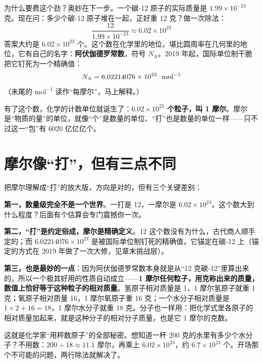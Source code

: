 为什么要费这个劲？奥妙在下一步。一个碳-12 原子的实际质量是 $1.99\times 10^{-23}$ 克。现在问：多少个碳-12 原子堆在一起，正好重 12 克？做一次除法：
\[
\frac{12}{1.99\times 10^{-23}}\approx 6.02\times 10^{23}
\]
答案大约是 $6.02\times 10^{23}$ 个。这个数在化学里的地位，堪比圆周率在几何里的地位，它有自己的名字：\textbf{阿伏伽德罗常数}，符号 $N_{\mathrm{A}}$。2019 年起，国际单位制干脆把它钉死为一个精确值：
\[
N_{\mathrm{A}}=6.02214076\times 10^{23}\ \ud{}{mol^{-1}}
\]
（末尾的 $\mathrm{mol^{-1}}$ 读作“每摩尔”，马上解释。）

有了这个数，化学的计数单位就诞生了：\textbf{$6.02\times 10^{23}$ 个粒子，叫 1 摩尔}。摩尔是“物质的量”的单位，就像“个”是数量的单位、“打”也是数量的单位一样——只不过这一“包”有 6020 亿亿亿个。

\section{摩尔像“打”，但有三点不同}

把摩尔理解成“打”的放大版，方向是对的，但有三个关键差别：

\textbf{第一，数量级完全不是一个世界}。一打是 12，一摩尔是 $6.02\times 10^{23}$。这个数大到什么程度？后面有个估算会专门震撼你一次。

\textbf{第二，“打”是约定俗成，摩尔是精确定义}。12 这个数没有为什么，古代商人顺手定的；而 $6.02214076\times 10^{23}$ 是被国际单位制钉死的精确值，它锚定在碳-12 上（锚定的方式在 2019 年做了一次大修，见章末挑战层）。

\textbf{第三，也是最妙的一点}：因为阿伏伽德罗常数本身就是从“12 克碳-12”里算出来的，所以一个极其好用的性质自动成立——\textbf{1 摩尔任何粒子，用克称出来的质量，数值上恰好等于这种粒子的相对质量}。氢原子相对质量是 1，1 摩尔氢原子就重 1 克；氧原子相对质量 16，1 摩尔氧原子重 16 克；一个水分子相对质量是 $1\times 2+16=18$，1 摩尔水分子就重 18 克。分子也一样用：把化学式里各原子的相对质量加起来，就是这种分子的相对分子质量，也是它 1 摩尔的克数。

这就是化学家“用秤数原子”的全部秘密。想知道一杯 200 克的水里有多少个水分子？不用数：$200\div 18\approx 11.1$ 摩尔，再乘上 $6.02\times 10^{23}$，约 $6.7\times 10^{24}$ 个。开场那个不可能的问题，两行除法就解决了。

